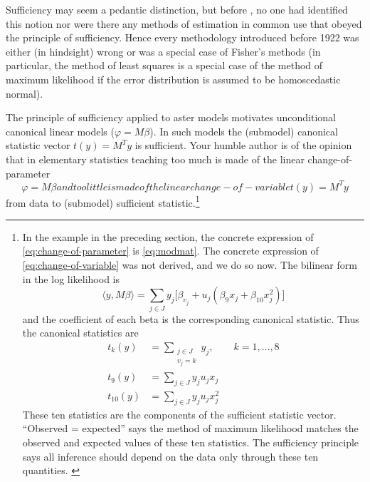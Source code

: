 \documentclass[11pt]{article}
\newcommand{\inner}[1]{\langle #1 \rangle}
\begin{document}
Sufficiency may seem a pedantic distinction, but before \citet{fisher},
no one had identified this notion nor were there any methods of estimation
in common use that obeyed the principle of sufficiency.  Hence every
methodology introduced before 1922 was either (in hindsight) wrong or was
a special case of Fisher's methods (in particular, the method of least squares
is a special case of the method of maximum likelihood if the error distribution
is assumed to be homoscedastic normal).

The principle of sufficiency applied to aster models motivates unconditional
canonical linear models ($\varphi = M \beta$).  In such models the (submodel)
canonical statistic vector $t(y) = M^T y$ is sufficient.  Your humble author
is of the opinion that in elementary statistics teaching too much is made
of the linear change-of-parameter
\begin{subequations}
\begin{equation} \label{eq:change-of-parameter}
   \varphi = M \beta
\end{equation}
and too little is made of the linear change-of-variable
\begin{equation} \label{eq:change-of-variable}
   t(y) = M^T y
\end{equation}
\end{subequations}
from data to (submodel) sufficient statistic.\footnote{In the example in the
preceding section, the concrete expression of \eqref{eq:change-of-parameter}
is \eqref{eq:modmat}.  The concrete expression of \eqref{eq:change-of-variable}
was not derived, and we do so now.  The bilinear form in the log likelihood is
$$
   \inner{y, M \beta}
   =
   \sum_{j \in J} y_j \bigl[ \beta_{v_j} + u_j (\beta_9 x_j + \beta_{10} x_j^2)
   \bigr]
$$
and the coefficient of each beta is the corresponding canonical statistic.
Thus the canonical statistics are
\begin{align*}
   t_k(y) & = \sum_{\substack{j \in J \\ v_j = k}} y_j, \qquad k = 1, \ldots, 8
   \\
   t_9(y) & = \sum_{j \in J} y_j u_j x_j
   \\
   t_{10}(y) & = \sum_{j \in J} y_j u_j x_j^2
\end{align*}
These ten statistics are the components of the sufficient statistic vector.
``Observed = expected'' says the method of maximum likelihood matches the
observed and expected values of these ten statistics.  The sufficiency
principle says all inference should depend on the data only through these
ten quantities. \label{foot:land}
}
\end{document}
